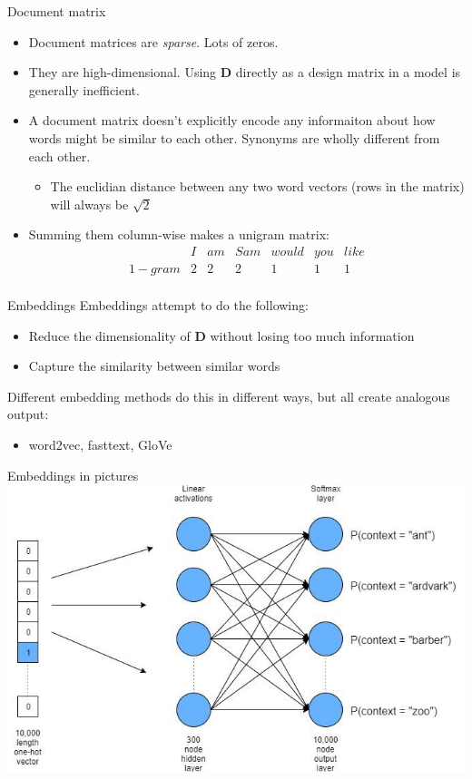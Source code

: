 \documentclass[10pt]{beamer}
\begin{document}
\begin{frame}{Document matrix}
\begin{itemize}
	\item Document matrices are \textit{sparse}.  Lots of zeros.  
	\item They are high-dimensional.  Using $\bm{D}$ directly as a design matrix in a model is generally inefficient.
	\item A document matrix doesn't explicitly encode any informaiton about how words might be similar to each other.  Synonyms are wholly different from each other.
	\begin{itemize}
		\item The euclidian distance between any two word vectors (rows in the matrix) will always be $\sqrt{2}$
	\end{itemize}
	\item Summing them column-wise makes a unigram matrix:
	\[ 
\begin{array}{c|cccccc}
     & I & am & Sam & would & you & like \\
     \hline
1-gram    & 2 & 2  & 2   & 1     & 1   &  1 \\
\end{array}\] 
\end{itemize}
\end{frame}

\begin{frame}{Embeddings}
Embeddings attempt to do the following:
\begin{itemize}
\item Reduce the dimensionality of $\bm{D}$ without losing too much information
\item Capture the similarity between similar words
\end{itemize}
Different embedding methods do this in different ways, but all create analogous output:
\begin{itemize}
\item word2vec, fasttext, GloVe
\end{itemize}
\end{frame}

\begin{frame}{Embeddings in pictures}
\centering
\includegraphics[width=.9\textwidth]{embeddings_example.jpeg}
\end{frame}
\end{document}
